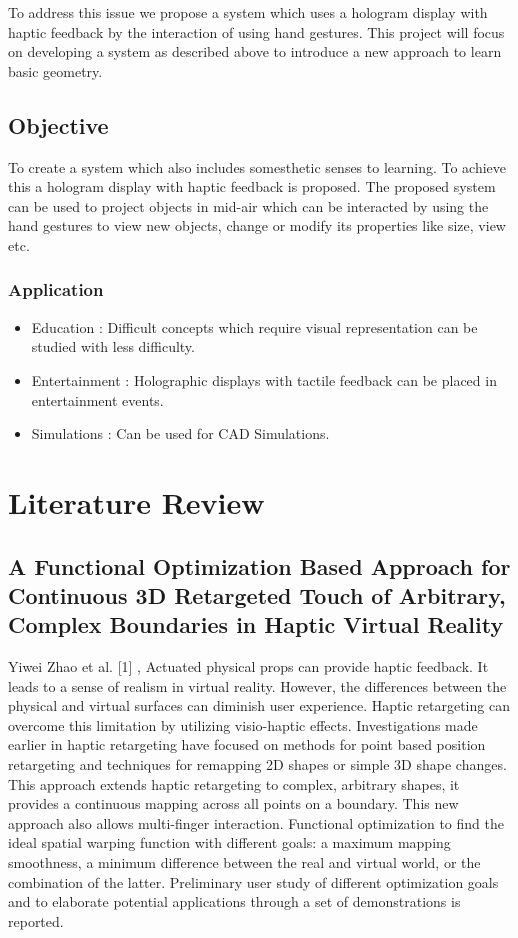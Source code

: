 \documentclass{fisatproject}
\begin{document}
\par To address this issue  we propose a system which uses a hologram display with haptic feedback by the interaction of using hand gestures. This project will focus on developing a system as described above to introduce a new approach to learn basic geometry.
\newpage
\section{Objective}

To create a system which also includes somesthetic senses to learning. To achieve this a hologram display with haptic feedback is proposed. The proposed system can be used to project objects in mid-air which can be interacted by using the hand gestures to view new objects, change or modify its properties like size, view etc.
\subsection{Application}
\begin{itemize}
    \item  Education : Difficult concepts which require visual representation can be studied with less difficulty. 
    \item  Entertainment : Holographic displays with tactile feedback can be placed in entertainment events.
    \item  Simulations : Can be used for CAD Simulations.
\end{itemize}
\chapter{Literature Review}
\section{ 
  \normalsize A Functional Optimization Based Approach for Continuous 3D Retargeted Touch of Arbitrary, Complex Boundaries in Haptic Virtual Reality
}
\par Yiwei Zhao et al. [1] ,
Actuated physical props can provide haptic feedback. It leads to a sense of realism in virtual reality. However, the differences between the physical and virtual surfaces can diminish user experience. Haptic retargeting can overcome this limitation by utilizing visio-haptic effects. Investigations made earlier in haptic retargeting have focused on methods for point based position retargeting and techniques for remapping 2D shapes or simple 3D shape changes. This approach extends haptic retargeting to complex, arbitrary shapes, it provides a continuous mapping across all points on a boundary. This new approach also allows multi-finger interaction.  Functional optimization to find the ideal spatial warping function with different goals: a maximum mapping smoothness, a minimum difference between the real and virtual world, or the combination of the latter.  Preliminary user study of different optimization goals and to elaborate potential applications through a set of demonstrations is reported.
\end{document}
